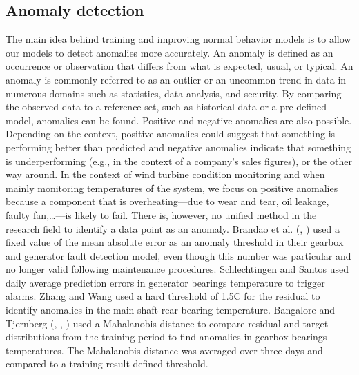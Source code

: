   \subsection{Anomaly detection}
    The main idea behind training and improving normal behavior models is to allow our models to detect anomalies more accurately.
    An anomaly is defined as an occurrence or observation that differs from what is expected, usual, or typical. 
    An anomaly is commonly referred to as an outlier or an uncommon trend in data in numerous domains such as statistics, data analysis, and security.
    By comparing the observed data to a reference set, such as historical data or a pre-defined model, anomalies can be found.
    Positive and negative anomalies are also possible. Depending on the context, positive anomalies could suggest that something is performing better than predicted and 
    negative anomalies indicate that something is underperforming (e.g., in the context of a company's sales figures), or the other way around. In the context of wind
    turbine condition monitoring and when mainly monitoring temperatures of the system, we focus on positive anomalies because a component that is 
    overheating---due to wear and tear, oil leakage, faulty fan,\dots---is likely to fail. There is, however, no unified method in the research field to identify a data point 
    as an anomaly. Brandao et al. (\cite{Brandao_1}, \cite{Brandao_2}) used a fixed value of the mean absolute error as an anomaly threshold in their 
    gearbox and generator fault detection model, even though this number was particular and no longer valid following maintenance procedures. 
    Schlechtingen and Santos \cite{Schlechtingen} used daily average prediction errors in generator bearings temperature to trigger alarms. 
    Zhang and Wang \cite{Zhang_Wang} used a hard threshold of 1.5\degree C for the residual to identify anomalies in the main shaft rear bearing temperature.
    Bangalore and Tjernberg (\cite{Bangalore_1}, \cite{Bangalore_2}, \cite{Bangalore_3}) used a Mahalanobis distance to compare residual and target distributions from 
    the training period to find anomalies in gearbox bearings temperatures. The Mahalanobis distance was averaged over three days and compared to a training result-defined threshold.\\

